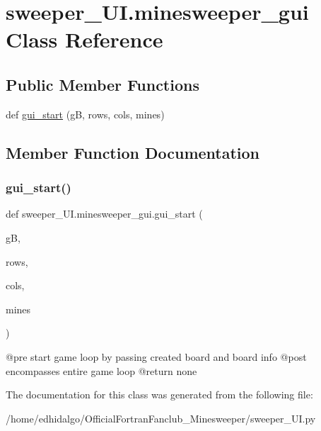 \hypertarget{classsweeper___u_i_1_1minesweeper__gui}{}\section{sweeper\+\_\+\+U\+I.\+minesweeper\+\_\+gui Class Reference}
\label{classsweeper___u_i_1_1minesweeper__gui}
\subsection*{Public Member Functions}
\begin{DoxyCompactItemize}
\item 
def \hyperlink{classsweeper___u_i_1_1minesweeper__gui_a9b40d50bb0783902917d33f0bbc14bf1}{gui\+\_\+start} (gB, rows, cols, mines)
\end{DoxyCompactItemize}


\subsection{Member Function Documentation}
\mbox{\label{classsweeper___u_i_1_1minesweeper__gui_a9b40d50bb0783902917d33f0bbc14bf1}} 
\subsubsection{\texorpdfstring{gui\+\_\+start()}{gui\_start()}}
{\footnotesize\ttfamily def sweeper\+\_\+\+U\+I.\+minesweeper\+\_\+gui.\+gui\+\_\+start (\begin{DoxyParamCaption}\item[{}]{gB,  }\item[{}]{rows,  }\item[{}]{cols,  }\item[{}]{mines }\end{DoxyParamCaption})}

\begin{DoxyVerb}@pre start game loop by passing created board and board info
@post encompasses entire game loop
@return none
\end{DoxyVerb}
 

The documentation for this class was generated from the following file\+:\begin{DoxyCompactItemize}
\item 
/home/edhidalgo/\+Official\+Fortran\+Fanclub\+\_\+\+Minesweeper/sweeper\+\_\+\+U\+I.\+py\end{DoxyCompactItemize}
